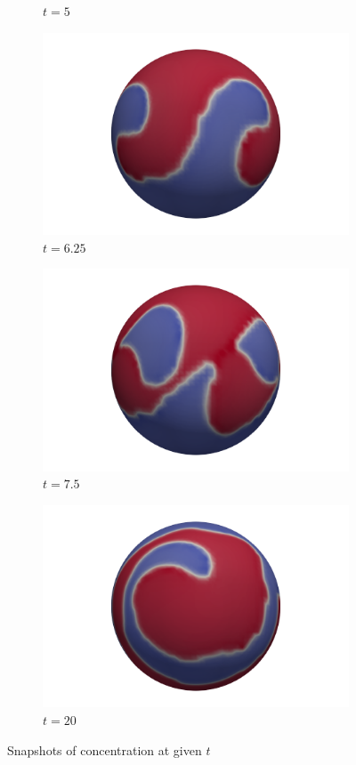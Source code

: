 \documentclass{article}
\begin{document}
\begin{figure}[h]
\begin{subfigure}[b]{0.15\textwidth}
	\caption{$t=5$}
\end{subfigure}
\begin{subfigure}[b]{0.15\textwidth}
	\includegraphics[scale=0.1]{images/c625.png}
	\caption{$t=6.25$}
\end{subfigure}
\begin{subfigure}[b]{0.15\textwidth}
	\includegraphics[scale=0.1]{images/c75.png}
	\caption{$t=7.5$}
\end{subfigure}
\begin{subfigure}[b]{0.15\textwidth}
	\includegraphics[scale=0.1]{images/c20.png}
	\caption{$t=20$}
\end{subfigure}
\caption{Snapshots of concentration at given $t$}
\end{figure}
\end{document}

